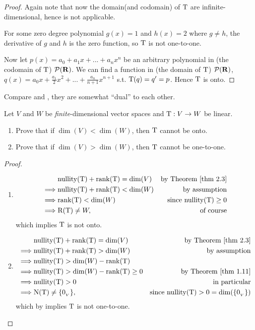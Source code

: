 \begin{proof}
Again note that now the domain(and codomain) of \(\mathrm{T}\) are infinite-dimensional, hence  is not applicable.

For some zero degree polynomial \(g(x) = 1\) and \(h(x) = 2\) where \(g \ne h\), the derivative of \(g\) and \(h\) is the zero function, so \(\mathrm{T}\) is not one-to-one.

Now let \(p(x) = a_0 + a_1 x + ... + a_n x^n\) be an arbitrary polynomial in (the codomain of \(\mathrm{T}\)) \(\mathcal{P}(\mathbf{R})\).
We can find a function in (the domain of \(\mathrm{T}\)) \(\mathcal{P}(\mathbf{R})\), \(q(x) = a_0 x + \frac{a_1}{2} x^2 + ... + \frac{a_n}{n + 1} x^{n + 1}\) s.t. \(\mathrm{T}(q) = q' = p\).
Hence \(\mathrm{T}\) is onto.
\end{proof}

\begin{note}
Compare  and , they are somewhat ``dual'' to each other.
\end{note}

\begin{exercise} \label{exercise 2.1.17}
Let \(V\) and \(W\) be \emph{finite}-dimensional vector spaces and \(\mathrm{T}: V \to W\) be linear.
\begin{enumerate}
\item Prove that if \(\dim(V) < \dim(W)\), then \(\mathrm{T}\) cannot be onto.
\item Prove that if \(\dim(V) > \dim(W)\), then \(\mathrm{T}\) cannot be one-to-one.
\end{enumerate}
\end{exercise}

\begin{proof} \ 
\begin{enumerate}
\item
\begin{align*}
             & \nullityT + \rankT = \dim(V) & \text{by \THM{2.3}} \\
    \implies & \nullityT + \rankT < \dim(W) & \text{by assumption} \\
    \implies & \rankT < \dim(W) & \text{since \(\nullityT \ge 0\)} \\
    \implies & \RANGET \ne W, & \text{of course}
\end{align*}
which implies \(\mathrm{T}\) is not onto.

\item
\begin{align*}
             & \nullityT + \rankT = \dim(V) & \text{by \THM{2.3}} \\
    \implies & \nullityT + \rankT > \dim(W) & \text{by assumption} \\
    \implies & \nullityT > \dim(W) - \rankT \\
    \implies & \nullityT > \dim(W) - \rankT \ge 0 & \text{by \THM{1.11}} \\
    \implies & \nullityT > 0 & \text{in particular} \\
    \implies & \NULLT \ne \{ \OV \}, & \text{since \(\nullityT > 0 = \dim(\{ \OV \})\)}
\end{align*}
which by  implies \(\mathrm{T}\) is not one-to-one.
\end{enumerate}
\end{proof}



